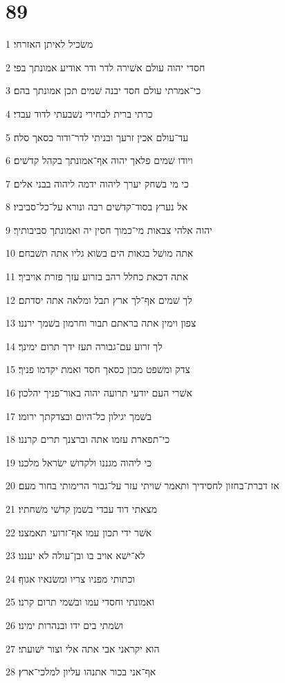 \chapter{89}

\par 1 משׂכיל לאיתן האזרחי׃
\par 2 חסדי יהוה עולם אשׁירה לדר ודר אודיע אמונתך בפי׃
\par 3 כי־אמרתי עולם חסד יבנה שׁמים תכן אמונתך בהם׃
\par 4 כרתי ברית לבחירי נשׁבעתי לדוד עבדי׃
\par 5 עד־עולם אכין זרעך ובניתי לדר־ודור כסאך סלה׃
\par 6 ויודו שׁמים פלאך יהוה אף־אמונתך בקהל קדשׁים׃
\par 7 כי מי בשׁחק יערך ליהוה ידמה ליהוה בבני אלים׃
\par 8 אל נערץ בסוד־קדשׁים רבה ונורא על־כל־סביביו׃
\par 9 יהוה אלהי צבאות מי־כמוך חסין יה ואמונתך סביבותיך׃
\par 10 אתה מושׁל בגאות הים בשׂוא גליו אתה תשׁבחם׃
\par 11 אתה דכאת כחלל רהב בזרוע עזך פזרת אויביך׃
\par 12 לך שׁמים אף־לך ארץ תבל ומלאה אתה יסדתם׃
\par 13 צפון וימין אתה בראתם תבור וחרמון בשׁמך ירננו׃
\par 14 לך זרוע עם־גבורה תעז ידך תרום ימינך׃
\par 15 צדק ומשׁפט מכון כסאך חסד ואמת יקדמו פניך׃
\par 16 אשׁרי העם יודעי תרועה יהוה באור־פניך יהלכון׃
\par 17 בשׁמך יגילון כל־היום ובצדקתך ירומו׃
\par 18 כי־תפארת עזמו אתה וברצנך תרים קרננו׃
\par 19 כי ליהוה מגננו ולקדושׁ ישׂראל מלכנו׃
\par 20 אז דברת־בחזון לחסידיך ותאמר שׁויתי עזר על־גבור הרימותי בחור מעם׃
\par 21 מצאתי דוד עבדי בשׁמן קדשׁי משׁחתיו׃
\par 22 אשׁר ידי תכון עמו אף־זרועי תאמצנו׃
\par 23 לא־ישׁא אויב בו ובן־עולה לא יעננו׃
\par 24 וכתותי מפניו צריו ומשׂנאיו אגוף׃
\par 25 ואמונתי וחסדי עמו ובשׁמי תרום קרנו׃
\par 26 ושׂמתי בים ידו ובנהרות ימינו׃
\par 27 הוא יקראני אבי אתה אלי וצור ישׁועתי׃
\par 28 אף־אני בכור אתנהו עליון למלכי־ארץ׃
